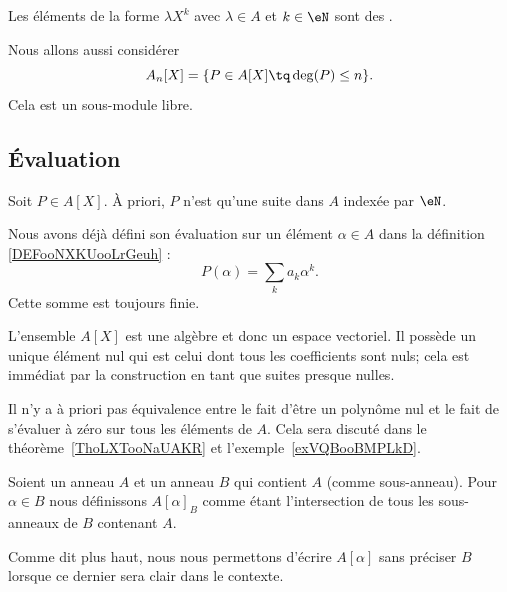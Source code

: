 \begin{normaltext}
Les éléments de la forme \( \lambda X^k\) avec \( \lambda\in A\) et \( k\in\eN\) sont des .

Nous allons aussi considérer
\begin{equation}
    A_n[X]=\{ P\in A[X]\tq \deg(P)\leq n \}.
\end{equation}
Cela est un sous-module libre.
\end{normaltext}

\subsection{Évaluation}

Soit \( P\in A[X]\). À priori, \( P\) n'est qu'une suite dans \( A\) indexée par \( \eN\). 


Nous avons déjà défini son évaluation sur un élément \( \alpha\in A\) dans la définition \ref{DEFooNXKUooLrGeuh} :
\begin{equation}
    P(\alpha)=\sum_ka_k\alpha^k.
\end{equation}
Cette somme est toujours finie.

\begin{normaltext}      \label{NORMooQFTJooLBcPxl}
    L'ensemble \( A[X]\) est une algèbre et donc un espace vectoriel. Il possède un unique élément nul qui est celui dont tous les coefficients sont nuls; cela est immédiat par la construction en tant que suites presque nulles.
\end{normaltext}

Il n'y a à priori pas équivalence entre le fait d'être un polynôme nul et le fait de s'évaluer à zéro sur tous les éléments de \( A\). Cela sera discuté dans le théorème~\ref{ThoLXTooNaUAKR} et l'exemple~\ref{exVQBooBMPLkD}.

\begin{definition}      \label{DEFooRFBFooKCXQsv}
    Soient un anneau \( A\) et un anneau \( B\) qui contient \( A\) (comme sous-anneau). Pour \( \alpha\in B\) nous définissons \( A[\alpha]_B\) comme étant l'intersection de tous les sous-anneaux de \( B\) contenant \( A\).
\end{definition}
Comme dit plus haut, nous nous permettons d'écrire \( A[\alpha]\) sans préciser \( B\) lorsque ce dernier sera clair dans le contexte.

